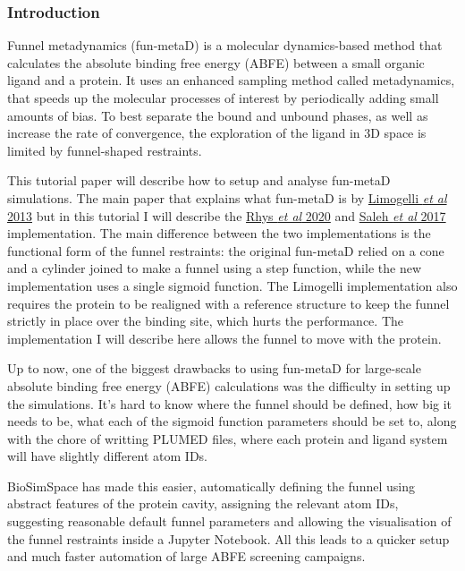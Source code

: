 \hypertarget{funnel-metadynamics-tutorial}{%
\label{funnel-metadynamics-tutorial}}
\hypertarget{Introduction}{%
\subsubsection{Introduction}\label{Introduction}}

Funnel metadynamics (fun-metaD) is a molecular dynamics-based method
that calculates the absolute binding free energy (ABFE) between a small
organic ligand and a protein. It uses an enhanced sampling method called
metadynamics, that speeds up the molecular processes of interest by
periodically adding small amounts of bias. To best separate the bound
and unbound phases, as well as increase the rate of convergence, the
exploration of the ligand in 3D space is limited by funnel-shaped
restraints.

This tutorial paper will describe how to setup and analyse fun-metaD
simulations. The main paper that explains what fun-metaD is by
\href{https://www.pnas.org/content/110/16/6358}{Limogelli \emph{et al}
2013} but in this tutorial I will describe the
\href{https://www.ncbi.nlm.nih.gov/pmc/articles/PMC7467642/}{Rhys
\emph{et al} 2020} and
\href{https://pubs.acs.org/doi/10.1021/acs.jcim.6b00772}{Saleh \emph{et
al} 2017} implementation. The main difference between the two
implementations is the functional form of the funnel restraints: the
original fun-metaD relied on a cone and a cylinder joined to make a
funnel using a step function, while the new implementation uses a single
sigmoid function. The Limogelli implementation also requires the protein
to be realigned with a reference structure to keep the funnel strictly
in place over the binding site, which hurts the performance. The
implementation I will describe here allows the funnel to move with the
protein.

Up to now, one of the biggest drawbacks to using fun-metaD for
large-scale absolute binding free energy (ABFE) calculations was the
difficulty in setting up the simulations. It's hard to know where the
funnel should be defined, how big it needs to be, what each of the
sigmoid function parameters should be set to, along with the chore of
writting PLUMED files, where each protein and ligand system will have
slightly different atom IDs.

BioSimSpace has made this easier, automatically defining the funnel
using abstract features of the protein cavity, assigning the relevant
atom IDs, suggesting reasonable default funnel parameters and allowing
the visualisation of the funnel restraints inside a Jupyter Notebook.
All this leads to a quicker setup and much faster automation of large
ABFE screening campaigns.

